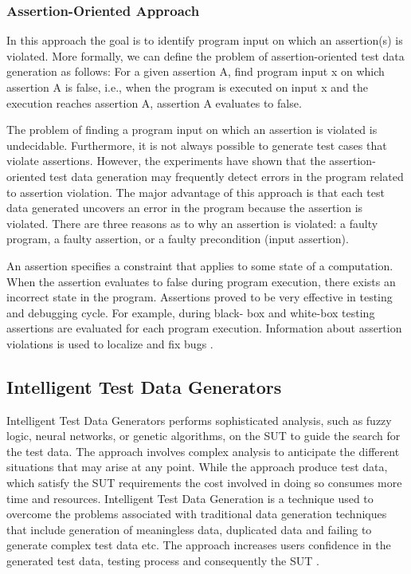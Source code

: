 \subsubsection{Assertion-Oriented Approach}
In this approach the goal is to identify program input on which an assertion(s) is violated. More formally, we can define the problem of assertion-oriented test data generation as follows: For a given assertion A, find program input x on which assertion A is false, i.e., when the program is executed on input x and the execution reaches assertion A, assertion A evaluates to false.

The problem of finding a program input on which an assertion is violated is undecidable. Furthermore, it is not always possible to generate test cases that violate assertions. However, the experiments have shown that the assertion-oriented test data generation may frequently detect errors in the program related to assertion violation. The major advantage of this approach is that each test data generated uncovers an error in the program because the assertion is violated. There are three reasons as to why an assertion is violated: a faulty program, a faulty assertion, or a faulty precondition (input assertion).

An assertion specifies a constraint that applies to some state of a computation. When the assertion evaluates to false during program execution, there exists an incorrect state in the program. Assertions proved to be very effective in testing and debugging cycle. For example, during black- box and white-box testing assertions are evaluated for each program execution. Information about assertion violations is used to localize and fix bugs \cite{korel1996assertion}.




\subsection{Intelligent Test Data Generators}
Intelligent Test Data Generators performs sophisticated analysis, such as fuzzy logic, neural networks, or genetic algorithms, on the SUT to guide the search for the test data. The approach involves complex analysis to anticipate the different situations that may arise at any point. While the approach produce test data, which satisfy the SUT requirements the cost involved in doing so consumes more time and resources. Intelligent Test Data Generation is a technique used to overcome the problems associated with traditional data generation techniques that include generation of meaningless data, duplicated data and failing to generate complex test data etc.  The approach increases users confidence in the generated test data, testing process and consequently the SUT \cite{ramamoorthy1975testing}.

